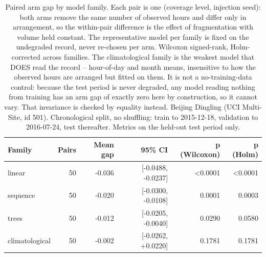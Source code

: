 \begin{table}[htbp]
\caption{Paired arm gap by model family. Each pair is one (coverage level, injection seed): both arms remove the same number of observed hours and differ only in arrangement, so the within-pair difference is the effect of fragmentation with volume held constant. The representative model per family is fixed on the undegraded record, never re-chosen per arm. Wilcoxon signed-rank, Holm-corrected across families. The climatological family is the weakest model that DOES read the record -- hour-of-day and month means, insensitive to how the observed hours are arranged but fitted on them. It is not a no-training-data control: because the test period is never degraded, any model reading nothing from training has an arm gap of exactly zero here by construction, so it cannot vary. That invariance is checked by equality instead. Beijing Dingling (UCI Multi-Site, id 501). Chronological split, no shuffling: train to 2015-12-18, validation to 2016-07-24, test thereafter. Metrics on the held-out test period only.}
\label{tab:ablation_paired_test}
\begin{tabular}{lrrrrr}
\toprule
Family & Pairs & Mean gap & 95\% CI & p (Wilcoxon) & p (Holm) \\
\midrule
linear & 50 & -0.036 & [-0.0488, -0.0237] & <0.0001 & <0.0001 \\
sequence & 50 & -0.020 & [-0.0300, -0.0108] & 0.0001 & 0.0003 \\
trees & 50 & -0.012 & [-0.0205, -0.0040] & 0.0290 & 0.0580 \\
climatological & 50 & -0.002 & [-0.0262, +0.0220] & 0.1781 & 0.1781 \\
\bottomrule
\end{tabular}
\end{table}
